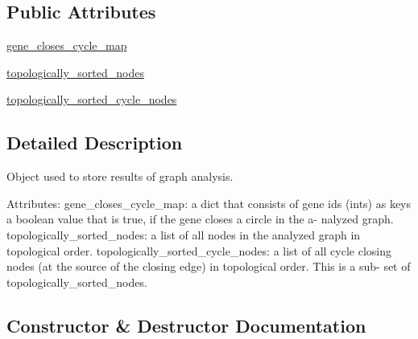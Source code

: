 \subsection*{Public Attributes}
\begin{DoxyCompactItemize}
\item 
\hyperlink{classNEAT__PyGenetics_1_1NEAT_1_1Analyst_1_1AnalysisResult_1_1AnalysisResult_a8ad8be788715b6298240055bbd835d5e}{gene\+\_\+closes\+\_\+cycle\+\_\+map}
\item 
\hyperlink{classNEAT__PyGenetics_1_1NEAT_1_1Analyst_1_1AnalysisResult_1_1AnalysisResult_a5dec17c624dfc418d21b543b366413e2}{topologically\+\_\+sorted\+\_\+nodes}
\item 
\hyperlink{classNEAT__PyGenetics_1_1NEAT_1_1Analyst_1_1AnalysisResult_1_1AnalysisResult_acca98f28e97dddad4c4ee0c86d499e58}{topologically\+\_\+sorted\+\_\+cycle\+\_\+nodes}
\end{DoxyCompactItemize}


\subsection{Detailed Description}
Object used to store results of graph analysis. 

Attributes\+: gene\+\_\+closes\+\_\+cycle\+\_\+map\+: a dict that consists of gene id\textquotesingle{}s (ints) as keys a boolean value that is true, if the gene closes a circle in the a-\/ nalyzed graph. topologically\+\_\+sorted\+\_\+nodes\+: a list of all nodes in the analyzed graph in topological order. topologically\+\_\+sorted\+\_\+cycle\+\_\+nodes\+: a list of all cycle closing nodes (at the source of the closing edge) in topological order. This is a sub-\/ set of topologically\+\_\+sorted\+\_\+nodes. 

\subsection{Constructor \& Destructor Documentation}
